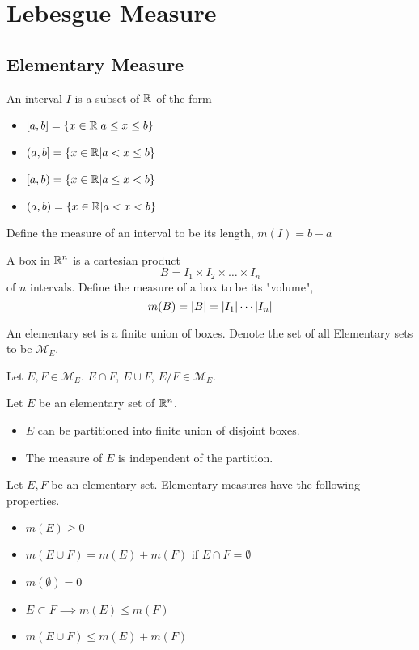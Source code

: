 \documentclass[a4paper]{article}
\begin{document}
\pagebreak
\section{Lebesgue Measure}
\subsection{Elementary Measure}
\begin{defn}[Intervals] An interval $I$ is a subset of $\mathbb{R}$ of the form 
\begin{itemize}
\item $[a,b]=\{x\in\mathbb{R}|a\leq x\leq b\}$
\item $(a,b]=\{x\in\mathbb{R}|a<x\leq b\}$
\item $[a,b)=\{x\in\mathbb{R}|a\leq x<b\}$
\item $(a,b)=\{x\in\mathbb{R}|a<x<b\}$
\end{itemize} Define the measure of an interval to be its length, $m(I)=b-a$
\end{defn}

\begin{defn}[Boxes] A box in $\mathbb{R}^n$ is a cartesian product $$B=I_1\times I_2\times\dots\times I_n$$ of $n$ intervals. Define the measure of a box to be its "volume", $$m(B)=\abs{B}=\abs{I_1}\cdots\abs{I_n}$$
\end{defn}

\begin{defn} An elementary set is a finite union of boxes. Denote the set of all Elementary sets to be $\mathcal{M}_E$. 
\end{defn}

\begin{prp} Let $E,F\in\mathcal{M}_E$. $E\cap F$, $E\cup F$, $E/F\in\mathcal{M}_E$. 
\end{prp}

\begin{prp} Let $E$ be an elementary set of $\mathbb{R}^n$. 
\begin{itemize}
\item $E$ can be partitioned into finite union of disjoint boxes. 
\item The measure of $E$ is independent of the partition. 
\end{itemize}
\end{prp}

\begin{prp} Let $E,F$ be an elementary set. Elementary measures have the following properties. 
\begin{itemize}
\item $m(E)\geq 0$
\item $m(E\cup F)=m(E)+m(F)$ if $E\cap F=\emptyset$
\item $m(\emptyset)=0$
\item $E\subset F\implies m(E)\leq m(F)$
\item $m(E\cup F)\leq m(E)+m(F)$
\end{itemize}
\end{prp}
\end{document}
